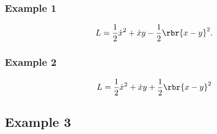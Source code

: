 \documentclass[a4paper,11pt]{article}
\begin{document}
\subsubsection*{Example 1}
\begin{equation}
L = \frac{1}{2} \dot{x}^2 + \dot{x} y - \frac{1}{2}\rbr{x-y}^2.
\end{equation}

% 

\subsubsection*{Example 2}

\begin{equation}
L = \frac{1}{2}\dot{x}^2 + \dot{x} y + \frac{1}{2}\rbr{x-y}^2
\end{equation}


\subsection*{Example 3}
\end{document}
